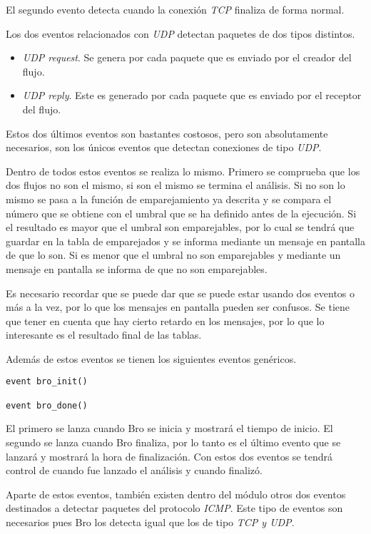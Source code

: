 \intro El segundo evento detecta cuando la conexión \textit{TCP} finaliza de forma normal.

\intro Los dos eventos relacionados con \textit{UDP} detectan paquetes de dos tipos distintos.

\begin{itemize}
\item \textit{UDP request}. Se genera por cada paquete que es enviado por el creador del flujo.
\item \textit{UDP reply}. Este es generado por cada paquete que es enviado por el receptor del flujo.
\end{itemize}

\intro Estos dos últimos eventos son bastantes costosos, pero son absolutamente necesarios, son los únicos 
eventos que detectan conexiones de tipo \textit{UDP}.

\intro Dentro de todos estos eventos se realiza lo mismo. Primero se comprueba que los dos flujos no son el mismo, 
si son el mismo se termina el análisis. Si no son lo mismo se pasa a la función de emparejamiento ya descrita y 
se compara el número que se obtiene con el umbral que se ha definido antes de la ejecución. Si el resultado es 
mayor que el umbral son emparejables, por lo cual se tendrá que guardar en la tabla de emparejados y se informa 
mediante un mensaje en pantalla de que lo son. Si es menor que el umbral no son emparejables y mediante un mensaje 
en pantalla se informa de que no son emparejables.

\intro Es necesario recordar que se puede dar que se puede estar usando dos eventos o más a la vez, por lo que los 
mensajes en pantalla pueden ser confusos. Se tiene que tener en cuenta que hay cierto retardo en los mensajes, por 
lo que lo interesante es el resultado final de las tablas.

\intro Además de estos eventos se tienen los siguientes eventos genéricos.

\begin{lstlisting}[style=CodigoC]
event bro_init()

event bro_done()
\end{lstlisting}

\intro El primero se lanza cuando Bro se inicia y mostrará el tiempo de inicio. El segundo se lanza cuando 
Bro finaliza, por lo tanto es el último evento que se lanzará y mostrará la hora de finalización. Con estos 
dos eventos se tendrá control de cuando fue lanzado el análisis y cuando finalizó.

\intro Aparte de estos eventos, también existen dentro del módulo otros dos eventos destinados a detectar 
paquetes del protocolo \textit{ICMP}. Este tipo de eventos son necesarios pues Bro los detecta igual que los 
de tipo \textit{TCP y UDP}.

